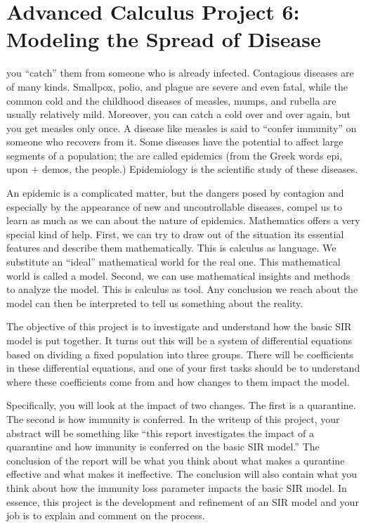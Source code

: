 \documentclass
[justified,nohyper]
{tufte-handout}
\begin{document}
\section{Advanced Calculus Project 6: Modeling the Spread of Disease}

 you ``catch'' them from someone who is already infected. Contagious diseases are of many kinds. Smallpox, polio, and plague are severe and even fatal, while the common cold and the childhood diseases of measles, mumps, and rubella are usually relatively mild. Moreover, you can catch a cold over and over again, but you get measles only once. A disease like measles is said to ``confer immunity'' on someone who recovers from it. Some diseases have the potential to affect large segments of a population; the are called epidemics (from the Greek words epi, upon + demos, the people.) Epidemiology is the scientific study of these diseases.

An epidemic is a complicated matter, but the dangers posed by contagion and especially by the appearance of new and uncontrollable diseases, compel us to learn as much as we can about the nature of epidemics. Mathematics offers a very special kind of help. First, we can try to draw out of the situation its essential features and describe them mathematically. This is calculus as language. We substitute an ``ideal'' mathematical world for the real one. This mathematical world is called a model. Second, we can use mathematical insights and methods to analyze the model. This is calculus as tool. Any conclusion we reach about the model can then be interpreted to tell us something about the reality.

The objective of this project is to investigate and understand how the basic SIR model is put together. It turns out this will be a system of differential equations based on dividing a fixed population into three groups. There will be coefficients in these differential equations, and one of your first tasks should be to understand where these coefficients come from and how changes to them impact the model.

Specifically, you will look at the impact of two changes. The first is a quarantine. The second is how immunity is conferred. In the writeup of this project, your abstract will be something like ``this report investigates the impact of a quarantine and how immunity is conferred on the basic SIR model.'' The conclusion of the report will be what you think about what makes a qurantine effective and what makes it ineffective. The conclusion will also contain what you think about how the immunity loss parameter impacts the basic SIR model. In essence, this project is the development and refinement of an SIR model and your job is to explain and comment on the process.
\end{document}

